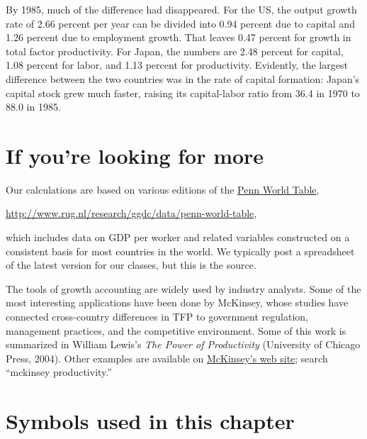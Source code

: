 \begin{enumerate}
By 1985, much of the difference had disappeared.
For the US, the output growth rate of 2.66 percent per year can be divided
into 0.94 percent due to capital and 1.26 percent due to employment growth.
That leaves 0.47 percent for growth in total factor productivity.
For Japan, the numbers are 2.48 percent for capital, 1.08 percent for
labor, and 1.13 percent for productivity.
Evidently, the largest difference between the two
countries was in the rate of capital formation:  Japan's capital stock
grew much faster, raising its capital-labor ratio from
36.4 in 1970 to 88.0 in 1985.
\end{enumerate}
\setlength{\leftmargini}{\oldleftmargini}

\section*{If you're looking for more}

Our calculations are based on various editions of the
\href{http://www.rug.nl/research/ggdc/data/penn-world-table}{Penn World Table},

\vspace*{\parskip}
\centerline{\url{http://www.rug.nl/research/ggdc/data/penn-world-table},}

which includes data on GDP per worker and related variables constructed
on a consistent basis for most countries in the world.
We typically post a spreadsheet of the latest version for our classes,
but this is the source.

The tools of growth accounting
 are widely used by industry analysts.
Some of the most interesting applications have been done by McKinsey,
whose studies have connected cross-country differences in TFP to
government regulation, management practices, and the competitive environment.
Some of this work is summarized in William Lewis's
{\it The Power of Productivity\/}
(University of Chicago Press, 2004).
Other examples are available on \href{http://www.mckinsey.com/insights/mgi/research/productivity_competitiveness_and_growth}{McKinsey's web site};
search ``mckinsey productivity.''

\section*{Symbols used in this chapter}

